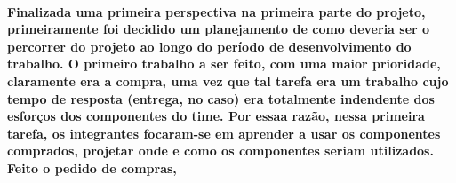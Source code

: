 \label{Métodos de implementação}
\paragraph{
Finalizada uma primeira perspectiva na primeira parte do projeto, primeiramente foi decidido um planejamento de como deveria ser o percorrer do projeto ao longo do período de desenvolvimento do trabalho.
O primeiro trabalho a ser feito, com uma maior prioridade, claramente era a compra, uma vez que tal tarefa era um trabalho cujo tempo de resposta (entrega, no caso) era totalmente indendente dos esforços dos componentes do time. Por essaa razão, nessa primeira tarefa, os integrantes focaram-se em aprender a usar os componentes comprados, projetar onde e como os componentes seriam utilizados.
Feito o pedido de compras, 
}